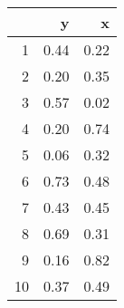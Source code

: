 \begin{table}[ht]
\centering
\begin{tabular}{rrr}
  \hline
 & y & x \\ 
  \hline
1 & 0.44 & 0.22 \\ 
  2 & 0.20 & 0.35 \\ 
  3 & 0.57 & 0.02 \\ 
  4 & 0.20 & 0.74 \\ 
  5 & 0.06 & 0.32 \\ 
  6 & 0.73 & 0.48 \\ 
  7 & 0.43 & 0.45 \\ 
  8 & 0.69 & 0.31 \\ 
  9 & 0.16 & 0.82 \\ 
  10 & 0.37 & 0.49 \\ 
   \hline
\end{tabular}
\end{table}
